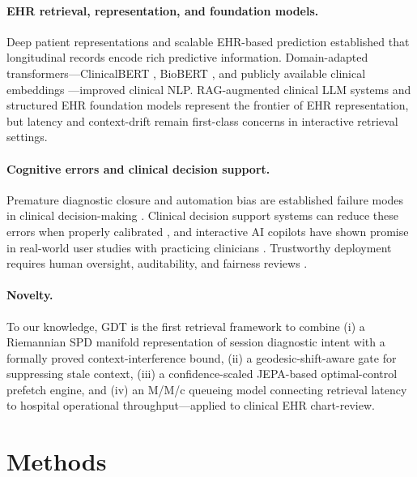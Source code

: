 \documentclass[11pt]{article}
\begin{document}
\paragraph{EHR retrieval, representation, and foundation models.}
Deep patient representations \citep{miotto2016} and scalable EHR-based prediction \citep{rajkomar2018} established that longitudinal records encode rich predictive information. Domain-adapted transformers---ClinicalBERT \citep{huang2019_clinicalbert}, BioBERT \citep{lee2020_biobert}, and publicly available clinical embeddings \citep{alsentzer2019}---improved clinical NLP. RAG-augmented clinical LLM systems \citep{liu2025_rag_biomed} and structured EHR foundation models \citep{guo2026_porter,shurrab2026_ehrragp} represent the frontier of EHR representation, but latency and context-drift remain first-class concerns in interactive retrieval settings.

\paragraph{Cognitive errors and clinical decision support.}
Premature diagnostic closure and automation bias are established failure modes in clinical decision-making \citep{croskerry2003,goddard2012}. Clinical decision support systems can reduce these errors when properly calibrated \citep{sutton2020_cds}, and interactive AI copilots have shown promise in real-world user studies with practicing clinicians \citep{zhu2026_aicare}. Trustworthy deployment requires human oversight, auditability, and fairness reviews \citep{lekadir25}.

\paragraph{Novelty.}
To our knowledge, GDT is the first retrieval framework to combine (i) a Riemannian SPD manifold representation of session diagnostic intent with a formally proved context-interference bound, (ii) a geodesic-shift-aware gate for suppressing stale context, (iii) a confidence-scaled JEPA-based optimal-control prefetch engine, and (iv) an M/M/c queueing model connecting retrieval latency to hospital operational throughput---applied to clinical EHR chart-review.

\section{Methods}
\label{sec:methods}
\end{document}
